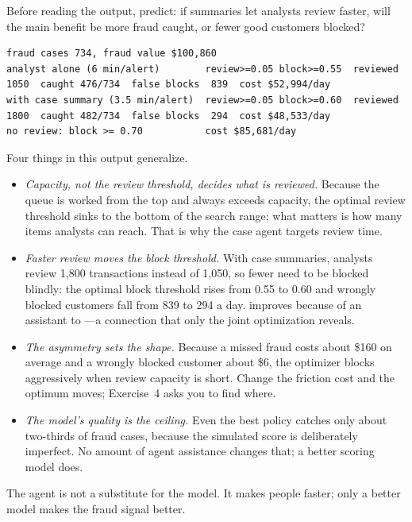 \begin{thinkabout}
Before reading the output, predict: if summaries let analysts review faster, will the main benefit be more fraud caught, or fewer good customers blocked?
\end{thinkabout}

\begin{lstlisting}[language={}, numbers=none, frame=none, xleftmargin=0em, basicstyle=\ttfamily\scriptsize]
fraud cases 734, fraud value $100,860
analyst alone (6 min/alert)        review>=0.05 block>=0.55  reviewed  1050  caught 476/734  false blocks  839  cost $52,994/day
with case summary (3.5 min/alert)  review>=0.05 block>=0.60  reviewed  1800  caught 482/734  false blocks  294  cost $48,533/day
no review: block >= 0.70           cost $85,681/day
\end{lstlisting}

Four things in this output generalize.
\begin{itemize}[itemsep=2pt]
  \item \emph{Capacity, not the review threshold, decides what is reviewed.} Because the queue is worked from the top and always exceeds capacity, the optimal review threshold sinks to the bottom of the search range; what matters is how many items analysts can reach. That is why the case agent targets review time.
  \item \emph{Faster review moves the block threshold.} With case summaries, analysts review 1{,}800 transactions instead of 1{,}050, so fewer need to be blocked blindly: the optimal block threshold rises from 0.55 to 0.60 and wrongly blocked customers fall from 839 to 294 a day.  improves because of an assistant to ---a connection that only the joint optimization reveals.
  \item \emph{The asymmetry sets the shape.} Because a missed fraud costs about \$160 on average and a wrongly blocked customer about \$6, the optimizer blocks aggressively when review capacity is short. Change the friction cost and the optimum moves; Exercise~4 asks you to find where.
  \item \emph{The model's quality is the ceiling.} Even the best policy catches only about two-thirds of fraud cases, because the simulated score is deliberately imperfect. No amount of agent assistance changes that; a better scoring model does.
\end{itemize}

\begin{keyidea}
The agent is not a substitute for the model. It makes people faster; only a better model makes the fraud signal better.
\end{keyidea}

